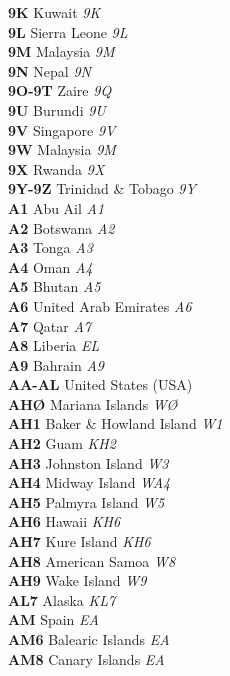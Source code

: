 \documentclass[landscape,a4paper]{article}
\begin{document}
\begin{multicols}{7}
\textbf{9K} Kuwait \emph{9K} \\
\textbf{9L} Sierra Leone \emph{9L} \\
\textbf{9M} Malaysia \emph{9M} \\
\textbf{9N} Nepal \emph{9N} \\
\textbf{9O-9T} Zaire \emph{9Q} \\
\textbf{9U} Burundi \emph{9U} \\
\textbf{9V} Singapore \emph{9V} \\
\textbf{9W} Malaysia \emph{9M} \\
\textbf{9X} Rwanda \emph{9X} \\
\textbf{9Y-9Z} Trinidad \& Tobago \emph{9Y} \\
\textbf{A1} Abu Ail \emph{A1} \\
\textbf{A2} Botswana \emph{A2} \\
\textbf{A3} Tonga \emph{A3} \\
\textbf{A4} Oman \emph{A4} \\
\textbf{A5} Bhutan \emph{A5} \\
\textbf{A6} United Arab Emirates \emph{A6} \\
\textbf{A7} Qatar \emph{A7} \\
\textbf{A8} Liberia \emph{EL} \\
\textbf{A9} Bahrain \emph{A9} \\
\textbf{AA-AL} United States (USA) \\
\textbf{AHØ} Mariana Islands \emph{WØ} \\
\textbf{AH1} Baker \& Howland Island \emph{W1} \\
\textbf{AH2} Guam \emph{KH2} \\
\textbf{AH3} Johnston Island \emph{W3} \\
\textbf{AH4} Midway Island \emph{WA4} \\
\textbf{AH5} Palmyra Island \emph{W5} \\
\textbf{AH6} Hawaii \emph{KH6} \\
\textbf{AH7} Kure Island \emph{KH6} \\
\textbf{AH8} American Samoa \emph{W8} \\
\textbf{AH9} Wake Island \emph{W9} \\
\textbf{AL7} Alaska \emph{KL7} \\
\textbf{AM} Spain \emph{EA} \\
\textbf{AM6} Balearic Islands \emph{EA} \\
\textbf{AM8} Canary Islands \emph{EA} \\

\end{multicols}
\end{document}
